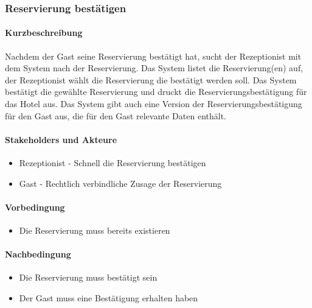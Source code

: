 \subsubsection{Reservierung bestätigen}
\label{UseCase_ReservierungBestätigen}

\paragraph{Kurzbeschreibung}
Nachdem der \Gls{Gast} seine \Gls{Reservierung} bestätigt hat, sucht der \Gls{Rezeptionist} mit dem System nach der \Gls{Reservierung}. Das System listet die \Gls{Reservierung}(en) auf, der \Gls{Rezeptionist} wählt die \Gls{Reservierung} die bestätigt werden soll. Das System bestätigt die gewählte \Gls{Reservierung} und druckt die Reservierungsbestätigung für das Hotel aus. Das System gibt auch eine Version der Reservierungsbestätigung für den \Gls{Gast} aus, die für den \Gls{Gast} relevante Daten enthält.

\paragraph{Stakeholders und Akteure}
\begin{itemize}
	\item \Gls{Rezeptionist} - Schnell die \Gls{Reservierung} bestätigen
	\item \Gls{Gast} - Rechtlich verbindliche Zusage der \Gls{Reservierung}
\end{itemize}

\paragraph{Vorbedingung}
\begin{itemize}
	\item Die \Gls{Reservierung} muss bereits existieren
\end{itemize}

\paragraph{Nachbedingung}
\begin{itemize}
	\item Die \Gls{Reservierung} muss bestätigt sein
	\item Der \Gls{Gast} muss eine Bestätigung erhalten haben
\end{itemize}

